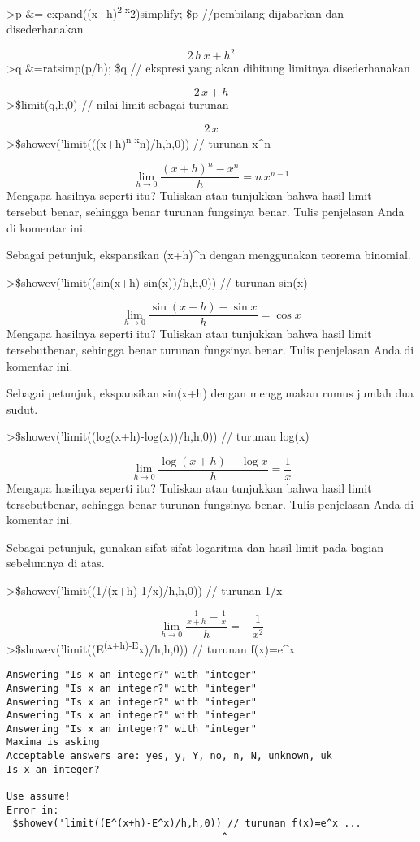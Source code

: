 \documentclass[
]{book}
\begin{document}
\textgreater p \&= expand((x+h)\textsuperscript{2-x}2)\textbar simplify; \$p //pembilang dijabarkan dan disederhanakan

\[2\,h\,x+h^2\]\textgreater q \&=ratsimp(p/h); \$q // ekspresi yang akan dihitung limitnya disederhanakan

\[2\,x+h\]\textgreater\$limit(q,h,0) // nilai limit sebagai turunan

\[2\,x\]\textgreater\$showev('limit(((x+h)\textsuperscript{n-x}n)/h,h,0)) // turunan x\^{}n

\[\lim_{h\rightarrow 0}{\frac{\left(x+h\right)^{n}-x^{n}}{h}}=n\,x^{n  -1}\]Mengapa hasilnya seperti itu? Tuliskan atau tunjukkan bahwa hasil limit tersebut benar, sehingga benar turunan fungsinya benar. Tulis penjelasan Anda di komentar ini.

Sebagai petunjuk, ekspansikan (x+h)\^{}n dengan menggunakan teorema binomial.

\textgreater\$showev('limit((sin(x+h)-sin(x))/h,h,0)) // turunan sin(x)

\[\lim_{h\rightarrow 0}{\frac{\sin \left(x+h\right)-\sin x}{h}}=\cos   x\]Mengapa hasilnya seperti itu? Tuliskan atau tunjukkan bahwa hasil limit tersebutbenar, sehingga benar turunan fungsinya benar. Tulis penjelasan Anda di komentar ini.

Sebagai petunjuk, ekspansikan sin(x+h) dengan menggunakan rumus jumlah dua sudut.

\textgreater\$showev('limit((log(x+h)-log(x))/h,h,0)) // turunan log(x)

\[\lim_{h\rightarrow 0}{\frac{\log \left(x+h\right)-\log x}{h}}=  \frac{1}{x}\]Mengapa hasilnya seperti itu? Tuliskan atau tunjukkan bahwa hasil limit tersebutbenar, sehingga benar turunan fungsinya benar. Tulis penjelasan Anda di komentar ini.

Sebagai petunjuk, gunakan sifat-sifat logaritma dan hasil limit pada bagian sebelumnya di atas.

\textgreater\$showev('limit((1/(x+h)-1/x)/h,h,0)) // turunan 1/x

\[\lim_{h\rightarrow 0}{\frac{\frac{1}{x+h}-\frac{1}{x}}{h}}=-\frac{1  }{x^2}\]\textgreater\$showev('limit((E\textsuperscript{(x+h)-E}x)/h,h,0)) // turunan f(x)=e\^{}x

\begin{verbatim}
Answering "Is x an integer?" with "integer"
Answering "Is x an integer?" with "integer"
Answering "Is x an integer?" with "integer"
Answering "Is x an integer?" with "integer"
Answering "Is x an integer?" with "integer"
Maxima is asking
Acceptable answers are: yes, y, Y, no, n, N, unknown, uk
Is x an integer?

Use assume!
Error in:
 $showev('limit((E^(x+h)-E^x)/h,h,0)) // turunan f(x)=e^x ...
                                     ^
\end{verbatim}
\end{document}
